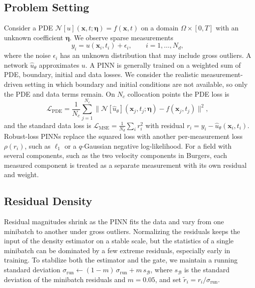 \documentclass[twoside]{article}
\newcommand{\sigrun}{\sigma_{\mathrm{run}}}
\begin{document}
\subsection{Problem Setting}
Consider a PDE $\mathcal{N}[u](\mathbf{x},t;\boldsymbol{\eta}) = f(\mathbf{x},t)$
on a domain $\Omega \times [0,T]$ with an unknown coefficient $\boldsymbol{\eta}$.
We observe sparse measurements
\begin{equation}
y_i = u(\mathbf{x}_i, t_i) + \epsilon_i, \qquad i = 1,\dots,N_d,
\label{eq:measure}
\end{equation}
where the noise $\epsilon_i$ has an unknown distribution that may include gross
outliers. A network $\hat u_\theta$ approximates $u$. A PINN is generally trained
on a weighted sum of PDE, boundary, initial and data losses. We consider the realistic
measurement-driven setting in which boundary and initial conditions are not
available, so only the PDE and data terms remain. On $N_c$ collocation points
the PDE loss is
\begin{equation}
\mathcal{L}_{\mathrm{PDE}} = \frac{1}{N_c}\sum_{j=1}^{N_c}
\big\| \mathcal{N}[\hat u_\theta](\mathbf{x}_j,t_j;\boldsymbol{\eta})
- f(\mathbf{x}_j,t_j) \big\|^2 ,
\label{eq:pde}
\end{equation}
and the standard data loss is
$\mathcal{L}_{\mathrm{MSE}} = \frac{1}{N_d}\sum_i r_i^2$ with residual
$r_i = y_i - \hat u_\theta(\mathbf{x}_i, t_i)$. Robust-loss PINNs replace the
squared loss with another per-measurement loss $\rho(r_i)$, such as $\ell_1$ or a
$q$-Gaussian negative log-likelihood. For a field with several components, such
as the two velocity components in Burgers, each measured component is treated
as a separate measurement with its own residual and weight.

\subsection{Residual Density}
Residual magnitudes shrink as the PINN fits the data and vary from one
minibatch to another under gross outliers. Normalizing the residuals keeps the
input of the density estimator on a stable scale, but the statistics of a
single minibatch can be dominated by a few extreme residuals, especially early
in training. To stabilize both the estimator and the gate, we maintain a running
standard deviation $\sigrun \leftarrow (1-m)\,\sigrun + m\, s_{\mathcal{B}}$,
where $s_{\mathcal{B}}$ is the standard deviation of the minibatch residuals and
$m = 0.05$, and set $\tilde r_i = r_i/\sigrun$.
\end{document}

